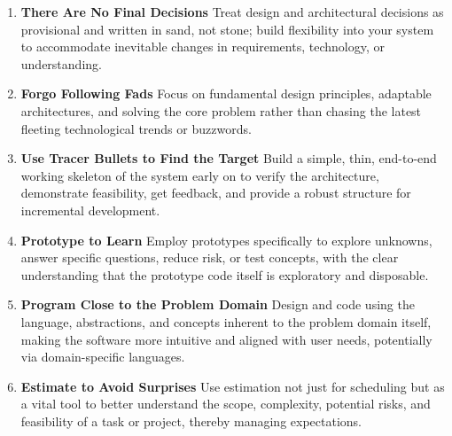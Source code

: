 \documentclass[11pt]{article}
\begin{document}
\begin{tcolorbox}[pragchapterbox={Chapter 2: A Pragmatic Approach}]
\begin{multicols}{2}
\begin{enumerate}[label=\arabic*., start=11, itemsep=1ex, topsep=0pt, partopsep=0pt, labelwidth=!, labelindent=0pt, leftmargin=*]
    \item \textbf{There Are No Final Decisions}
    Treat design and architectural decisions as provisional and written in sand, not stone; build flexibility into your system to accommodate inevitable changes in requirements, technology, or understanding.

    \item \textbf{Forgo Following Fads}
    Focus on fundamental design principles, adaptable architectures, and solving the core problem rather than chasing the latest fleeting technological trends or buzzwords.

    \item \textbf{Use Tracer Bullets to Find the Target}
    Build a simple, thin, end-to-end working skeleton of the system early on to verify the architecture, demonstrate feasibility, get feedback, and provide a robust structure for incremental development.

    \item \textbf{Prototype to Learn}
    Employ prototypes specifically to explore unknowns, answer specific questions, reduce risk, or test concepts, with the clear understanding that the prototype code itself is exploratory and disposable.

    \item \textbf{Program Close to the Problem Domain}
    Design and code using the language, abstractions, and concepts inherent to the problem domain itself, making the software more intuitive and aligned with user needs, potentially via domain-specific languages.

    \item \textbf{Estimate to Avoid Surprises}
    Use estimation not just for scheduling but as a vital tool to better understand the scope, complexity, potential risks, and feasibility of a task or project, thereby managing expectations.
\end{enumerate}
\end{multicols}
\end{tcolorbox}
\end{document}
